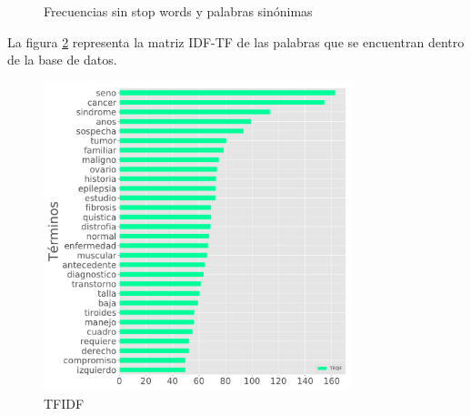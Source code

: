 \begin{figure}[H]
	\centering
	\caption{Frecuencias sin stop words y palabras sinónimas} \label{fig:sin}
\end{figure} 

La figura \ref{fig:IDFTF} representa la matriz IDF-TF de las palabras que se encuentran dentro de la base de datos.  

\begin{figure}[H] 
	\centering
	\includegraphics[width=0.8\textwidth]{Kap4/TFIDF1}
	\caption{TFIDF} 
	\label{fig:IDFTF}
\end{figure}

